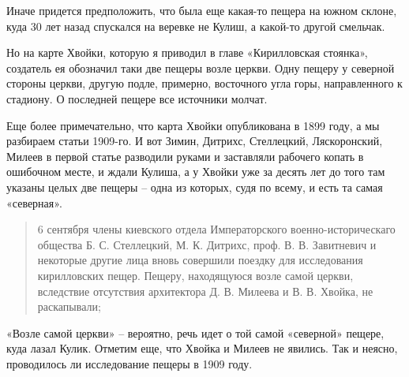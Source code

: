 Иначе придется предположить, что была еще какая-то пещера на южном склоне, куда 30 лет назад спускался на веревке не Кулиш, а какой-то другой смельчак.

Но на карте Хвойки, которую я приводил в главе «Кирилловская стоянка», создатель ея обозначил таки две пещеры возле церкви. Одну пещеру у северной стороны церкви, другую подле, примерно, восточного угла горы, направленного к стадиону. О последней пещере все источники молчат.

Еще более примечательно, что карта Хвойки опубликована в 1899 году, а мы разбираем статьи 1909-го. И вот Зимин, Дитрихс, Стеллецкий, Ляскоронский, Милеев в первой статье разводили руками и заставляли рабочего копать в ошибочном месте, и ждали Кулиша, а у Хвойки уже за десять лет до того там указаны целых две пещеры – одна из которых, судя по всему, и есть та самая «северная».

\begin{quotation}
6 сентября члены киевского отдела Императорского военно-историческаго общества Б. С. Стеллецкий, М. К. Дитрихс, проф. В. В. Завитневич и некоторые другие лица вновь совершили поездку для исследования кирилловских пещер. Пещеру, находящуюся возле самой церкви, вследствие отсутствия архитектора Д. В. Милеева и В. В. Хвойка, не раскапывали;
\end{quotation}

«Возле самой церкви» – вероятно, речь идет о той самой «северной» пещере, куда лазал Кулик. Отметим еще, что Хвойка и Милеев не явились. Так и неясно, проводилось ли исследование пещеры в 1909 году. 

